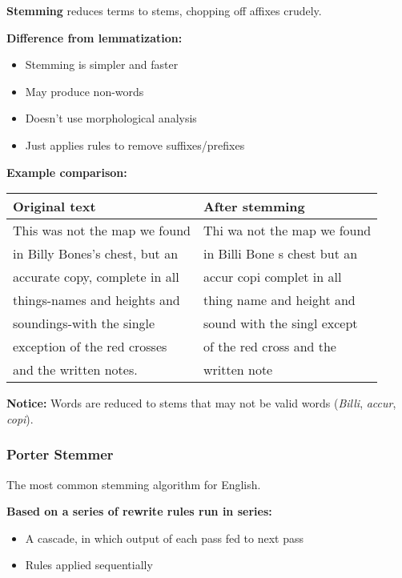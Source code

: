 \documentclass[11pt,a4paper]{article}
\theoremstyle{definition}
\theoremstyle{plain}
\theoremstyle{remark}
\begin{document}
\textbf{Stemming} reduces terms to stems, chopping off affixes crudely.

\textbf{Difference from lemmatization:}
\begin{itemize}
    \item Stemming is simpler and faster
    \item May produce non-words
    \item Doesn't use morphological analysis
    \item Just applies rules to remove suffixes/prefixes
\end{itemize}

\textbf{Example comparison:}

\begin{table}[h]
\centering
\begin{tabular}{|l|l|}
\hline
\textbf{Original text} & \textbf{After stemming} \\
\hline
This was not the map we found & Thi wa not the map we found \\
in Billy Bones's chest, but an & in Billi Bone s chest but an \\
accurate copy, complete in all & accur copi complet in all \\
things-names and heights and & thing name and height and \\
soundings-with the single & sound with the singl except \\
exception of the red crosses & of the red cross and the \\
and the written notes. & written note \\
\hline
\end{tabular}
\end{table}

\textbf{Notice:} Words are reduced to stems that may not be valid words (\textit{Billi}, \textit{accur}, \textit{copi}).

\subsubsection{Porter Stemmer}

The most common stemming algorithm for English.

\textbf{Based on a series of rewrite rules run in series:}
\begin{itemize}
    \item A cascade, in which output of each pass fed to next pass
    \item Rules applied sequentially
\end{itemize}
\end{document}
